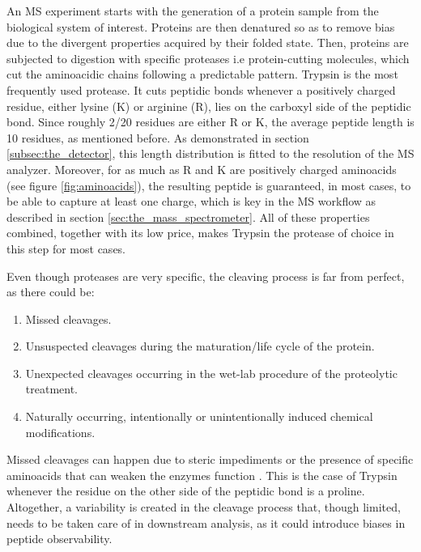 An \ac{MS} experiment starts with the generation of a protein sample from the biological system of interest. Proteins are then denatured  so as to remove bias due to the divergent properties acquired by their folded state. Then, proteins are subjected to digestion with specific proteases i.e protein-cutting molecules, which cut the aminoacidic chains following a predictable pattern. Trypsin is the most frequently used protease. It cuts peptidic bonds whenever a positively charged residue, either lysine (K) or arginine (R), lies on the carboxyl side of the peptidic bond. Since roughly 2/20 residues are either R or K, the average peptide length is 10 residues, as mentioned before. As demonstrated in section \ref{subsec:the_detector}, this length distribution is fitted to the resolution of the MS analyzer. Moreover, for as much as R and K are positively charged aminoacids (see figure \ref{fig:aminoacids}), the resulting peptide is guaranteed, in most cases, to be able to capture at least one charge, which is key in the \ac{MS} workflow as described in section \ref{sec:the_mass_spectrometer}. All of these properties combined, together with its low price, makes Trypsin the protease of choice in this step for most cases.

Even though proteases are very specific, the cleaving process is far from perfect, as there could be: \cite{Barsnes2008}

\begin{enumerate}

\item Missed cleavages.

\item Unsuspected cleavages during the maturation/life cycle of the protein.

\item Unexpected cleavages occurring in the wet-lab procedure of the proteolytic treatment.

\item Naturally occurring, intentionally or unintentionally induced chemical modifications.

\end{enumerate}

Missed cleavages can happen due to steric impediments or the presence of specific aminoacids that can weaken the enzyme\textquotesingle s function \cite{Siepen2007}. This is the case of Trypsin whenever the residue on the other side of the peptidic bond is a proline. Altogether, a variability is created in the cleavage process that, though limited, needs to be taken care of in downstream analysis, as it could introduce biases in peptide observability.

